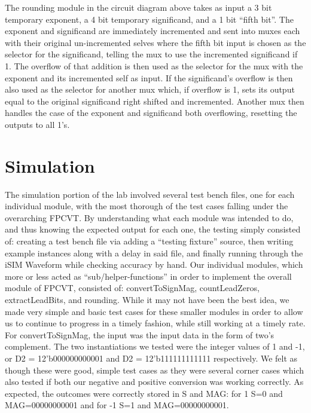 \documentclass{article}
\begin{document}
The rounding module in the circuit diagram above takes as input a 3 bit temporary exponent, a 4 bit temporary significand, and a 1 bit ``fifth bit''.  The exponent and significand are immediately incremented and sent into muxes each with their original un-incremented selves where the fifth bit input is chosen as the selector for the significand, telling the mux to use the incremented significand if 1.  The overflow of that addition is then used as the selector for the mux with the exponent and its incremented self as input.  If the significand's overflow is then also used as the selector for another mux which, if overflow is 1, sets its output equal to the original significand right shifted and incremented.  Another mux then handles the case of the exponent and significand both overflowing, resetting the outputs to all 1's. 


\section*{Simulation}

The simulation portion of the lab involved several test bench files, one for each individual module, with the most thorough of the test cases falling under the overarching FPCVT.  By understanding what each module was intended to do, and thus knowing the expected output for each one, the testing simply consisted of: creating a test bench file via adding a ``testing fixture'' source, then writing example instances along with a delay in said file, and finally running through the iSIM Waveform while checking accuracy by hand. Our individual modules, which more or less acted as ``sub/helper-functions'' in order to implement the overall module of FPCVT, consisted of: convertToSignMag, countLeadZeros, extractLeadBits, and rounding.  While it may not have been the best idea, we made very simple and basic test cases for these smaller modules in order to allow us to continue to progress in a timely fashion, while still working at a timely rate.  \\ 

For convertToSignMag, the input was the input data in the form of two's complement.  The two instantiations we tested were the integer values of 1 and -1, or D2 = 12'b000000000001 and D2 = 12'b111111111111 respectively.  We felt as though these were good, simple test cases as they were several corner cases which also tested if both our negative and positive conversion was working correctly.  As expected, the outcomes were correctly stored in S and MAG: for 1 S=0 and MAG=00000000001 and for -1 S=1 and MAG=00000000001.     
\end{document}
